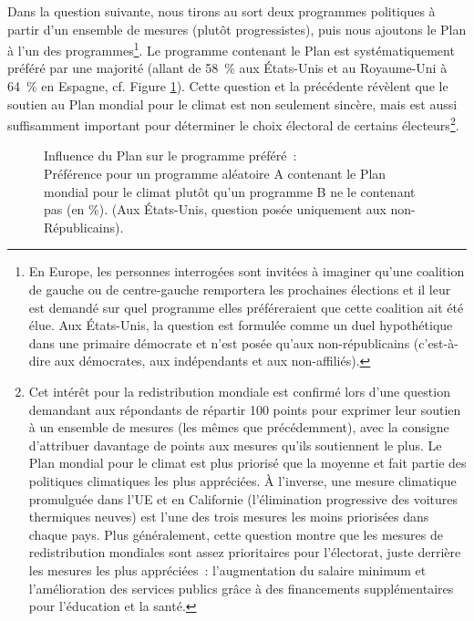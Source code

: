 \documentclass[a5paper,french,openany]{memoir}
\begin{document}
Dans la question suivante, nous tirons au sort deux programmes politiques à partir d'un ensemble de mesures (plutôt progressistes), puis nous ajoutons le Plan à l'un des programmes\footnote{En Europe, les personnes interrogées sont invitées à imaginer qu'une coalition de gauche ou de centre-gauche remportera les prochaines élections et il leur est demandé sur quel programme elles préféreraient que cette coalition ait été élue. Aux États-Unis, la question est formulée comme un duel hypothétique dans une primaire démocrate et n'est posée qu'aux non-républicains (c'est-à-dire aux démocrates, aux indépendants et aux non-affiliés).}. Le programme contenant le Plan est systématiquement préféré par une majorité (allant de 58~\% aux États-Unis et au Royaume-Uni à 64~\% en Espagne, cf. Figure \ref{fig:conjoint_left_ag_b}). Cette question et la précédente révèlent que le soutien au Plan mondial pour le climat est non seulement sincère, mais est aussi suffisamment important pour déterminer le choix électoral de certains électeurs\footnote{
Cet intérêt pour 
la redistribution mondiale est confirmé lors d'une question demandant aux répondants de répartir 100 points pour exprimer leur soutien à un ensemble de mesures (les mêmes que précédemment), avec la consigne d'attribuer davantage de points aux mesures qu'ils soutiennent le plus. Le Plan mondial pour le climat est plus priorisé que la moyenne et fait partie des politiques climatiques les plus appréciées. À l'inverse, une mesure climatique promulguée dans l'UE et en Californie (l'élimination progressive des voitures thermiques neuves) est l'une des trois mesures les moins priorisées dans chaque pays. Plus généralement, cette question montre que les mesures de redistribution mondiales sont assez prioritaires pour l'électorat, juste derrière les mesures les plus appréciées~: l'augmentation du salaire minimum et l'amélioration des services publics grâce à des financements supplémentaires pour l'éducation et la santé.}. 

\begin{figure}[h!] 
  \caption[Influence du Plan sur le programme préféré]{Influence du Plan sur le programme préféré~:\\ Préférence pour un programme aléatoire A contenant le Plan mondial pour le climat plutôt qu'un programme B ne le contenant pas (en \%). (Aux États-Unis, question posée uniquement aux non-Républicains).}\label{fig:conjoint_left_ag_b}
\end{figure}
\end{document}
